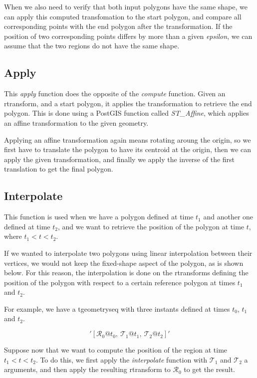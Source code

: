 When we also need to verify that both input polygons have the same shape, we can apply this computed transfomation to the start polygon, and compare all corresponding points with the end polygon after the transformation. If the position of two corresponding points differs by more than a given \textit{epsilon}, we can assume that the two regions do not have the same shape.

\subsection{Apply}

This \textit{apply} function does the opposite of the \textit{compute} function. Given an rtransform, and a start polygon, it applies the transformation to retrieve the end polygon. This is done using a PostGIS function called \textit{ST\_Affine}, which applies an affine transformation to the given geometry. 

Applying an affine transformation again means rotating aroung the origin, so we first have to translate the polygon to have its centroid at the origin, then we can apply the given transformation, and finally we apply the inverse of the first translation to get the final polygon.

\subsection{Interpolate}

This function is used when we have a polygon defined at time $t_1$ and another one defined at time $t_2$, and we want to retrieve the position of the polygon at time $t$, where $t_1 < t < t_2$.

If we wanted to interpolate two polygons using linear interpolation between their vertices, we would not keep the fixed-shape aspect of the polygon, as is shown below. For this reason, the interpolation is done on the rtransforms defining the position of the polygon with respect to a certain reference polygon at times $t_1$ and $t_2$.


For example, we have a tgeometryseq with three instants defined at times $t_0$, $t_1$ and $t_2$. 

\[
    '[\mathcal{R}_0@t_0,\ \mathcal{T}_1@t_1,\ \mathcal{T}_2@t_2]'
\]

Suppose now that we want to compute the position of the region at time $t_1 < t < t_2$. To do this, we first apply the \textit{interpolate} function with $\mathcal{T}_1$ and $\mathcal{T}_2$ a arguments, and then apply the resulting rtransform to $\mathcal{R}_0$ to get the result.

